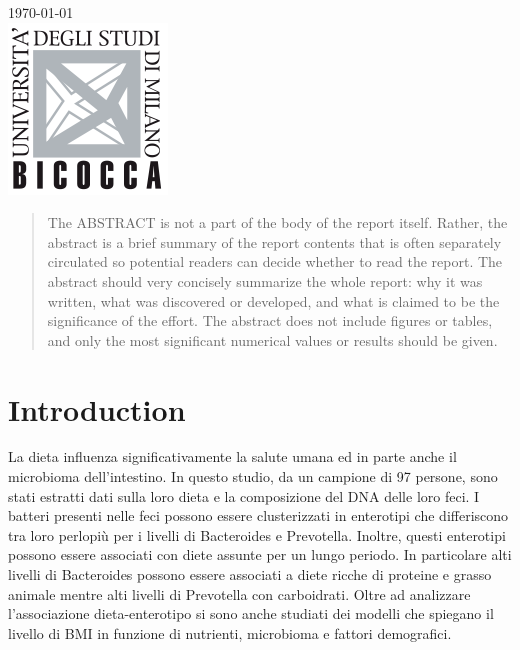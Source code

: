 \begin{titlepage}
{\large \today}\\[2cm] %


\includegraphics{figs/logo.png}\\[1cm] %
 

\vfill %

\end{titlepage}


\begin{abstract}
The ABSTRACT is not a part of the body of the report itself. Rather, the abstract is a brief summary of the report contents that is often separately circulated so potential readers can decide whether to read the report. The abstract should very concisely summarize the whole report: why it was written, what was discovered or developed, and what is claimed to be the significance of the effort. The abstract does not include figures or tables, and only the most significant numerical values or results should be given.
\end{abstract}

\section{Introduction}
La dieta influenza significativamente la salute umana ed in parte anche il microbioma dell’intestino. In questo studio, da un campione di 97 persone, sono stati estratti dati sulla loro dieta e la composizione del DNA delle loro feci. I batteri presenti nelle feci possono essere clusterizzati in enterotipi che differiscono tra loro perlopiù per i livelli di Bacteroides e Prevotella. Inoltre, questi enterotipi possono essere associati con diete assunte per un lungo periodo. In particolare alti livelli di Bacteroides possono essere associati a diete ricche di proteine e grasso animale mentre alti livelli di Prevotella con carboidrati. 
Oltre ad analizzare l’associazione dieta-enterotipo si sono anche studiati dei modelli che spiegano il livello di BMI in funzione di nutrienti, microbioma e fattori demografici.

